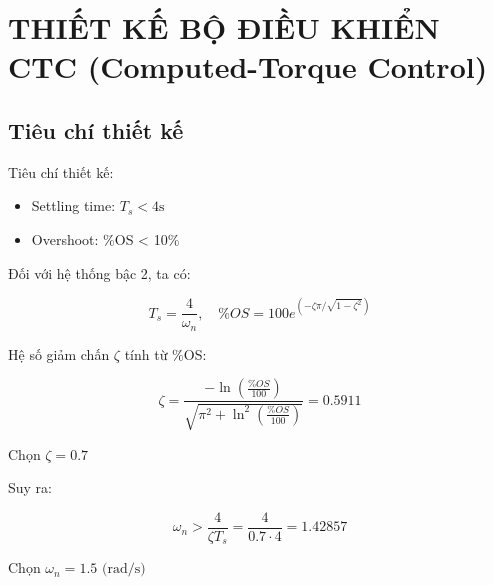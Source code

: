 \chapter{THIẾT KẾ BỘ ĐIỀU KHIỂN CTC (Computed-Torque Control)}
    \section{Tiêu chí thiết kế}
    \hspace*{0.6cm}Tiêu chí thiết kế:
    \begin{itemize}
        \item Settling time: $T_s < 4\text{s}$
        \item Overshoot: \%OS < 10\%
    \end{itemize}

    Đối với hệ thống bậc 2, ta có:

    \[
    T_s = \frac{4}{\omega_n}, \quad \%OS = 100e^{\left(-\zeta\pi / \sqrt{1-\zeta^2}\right)}
    \]

    Hệ số giảm chấn $\zeta$ tính từ \%OS:

    \[
    \zeta = \frac{-\ln\left(\frac{\%OS}{100}\right)}{\sqrt{\pi^2 + \ln^2\left(\frac{\%OS}{100}\right)}} = 0.5911
    \]

    Chọn $\zeta = 0.7$

    Suy ra:

    \[
    \omega_n > \frac{4}{\zeta T_s} = \frac{4}{0.7 \cdot 4} = 1.42857
    \]

    Chọn $\omega_n = 1.5 \text{ (rad/s)}$

